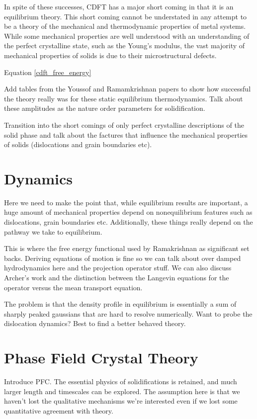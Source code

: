 In spite of these successes, CDFT has a major short coming in that it is an
equilibrium theory. This short coming cannot be understated in any attempt to
be a theory of the mechanical and thermodynamic properties of metal systems.
While some mechanical properties are well understood with an understanding of
the perfect crystalline state, such as the Young's modulus, the vast majority
of mechanical properties of solids is due to their microstructural defects.

Equation \ref{cdft_free_energy} {\color{ForestGreen} { \bfseries
    
    Add tables from the Youssof and Ramamkrishnan papers to show how successful
    the theory really was for these static equilibrium thermodynamics. Talk
    about these amplitudes as the nature order parameters for solidification.
    
    Transition into the short comings of only perfect crystalline
    descriptions of the solid phase and talk about the factures that
    influence the mechanical properties of solids (dislocations and grain
    boundaries etc).} }

\section{Dynamics} %

{\color{ForestGreen} { \bfseries
    
    
    Here we need to make the point that, while equilibrium results are
    important, a huge amount of mechanical properties depend on
    nonequilibrium features such as dislocations, grain boundaries etc.
    Additionally, these things really depend on the pathway we take to
    equilibrium. 

    This is where the free energy functional used by Ramakrishnan as
    significant set backs. Deriving equations of motion is fine so we can
    talk about over damped hydrodynamics here and the projection operator
    stuff. We can also discuss Archer's work and the distinction between
    the Langevin equations for the operator versus the mean transport
    equation.

    The problem is that the density profile in equilibrium is essentially
    a sum of sharply peaked gaussians that are hard to resolve
    numerically. Want to probe the dislocation dynamics? Best to find a
    better behaved theory.} }

\section{Phase Field Crystal Theory} %

{\color{ForestGreen} {\bfseries


    Introduce PFC. The essential physics of solidifications is retained,
    and much larger length and timescales can be explored. The assumption
    here is that we haven't lost the qualitative mechanisms we're
    interested even if we lost some quantitative agreement with theory.} }
